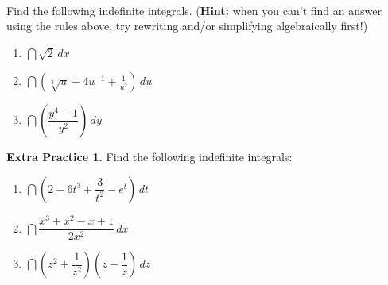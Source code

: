 \documentclass[10pt]{article}
\begin{document}
\

{} Find the following indefinite integrals. ({\bf Hint:} when you can't find an answer using the rules above, try rewriting and/or simplifying algebraically first!) 

\begin{enumerate}

\item[(a)] $\dint \sqrt2 \,dx$

\vfill

\item[(b)] $\dint \left(\sqrt[3]{u}+4u^{-1}+\frac{1}{u^2}\right)\,du$

\vfill

\item[(c)] $\dint \left(\dfrac{y^4-1}{y^2} \right)\,dy$ 

\vfill
\vfill

\end{enumerate}

\newpage%

{\bf\color{blue}Extra Practice 1.} Find the following indefinite integrals:

\begin{enumerate}

\item[(a)] $\dint \left(2 - 6t^3 + \dfrac{3}{t^2} - e^t \right)\,dt$

\vfill

\item[(b)] $\dint \dfrac{x^3+x^2-x+1}{2x^2}\,dx$

\vfill
\vfill

\item[(c)] $\dint \left( z^2 + \dfrac1{z^2}\right) \left( z - \dfrac{1}{z} \right) \, dz$

\vfill
\vfill

\end{enumerate}
\end{document}
